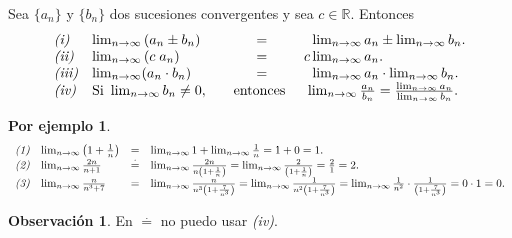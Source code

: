 \documentclass{article}
\theoremstyle{definition}
\newtheorem*{obs}{Observación}
\newtheorem*{ej}{Por ejemplo}
\theoremstyle{remark}
\begin{document}
\begin{teo}
  Sea $\{a_n\}$ y $\{b_n\}$ dos sucesiones convergentes y sea $c \in \mathbb{R}$. Entonces $$\begin{array}{llcl}

    \emph{(i)}      &   \lim_{n\to\infty}{\left(a_n \pm b_n\right)}\;&=&\phantom{c}\lim_{n \to \infty} a_n \pm \lim_{n \to \infty}{b_n}. \\
    \emph{(ii)}     &   \lim_{n \to \infty}{(c\; a_n)}\: \;\;\;\;\;\;&=& c \lim_{n \to \infty}{a_n}. \\
    \emph{(iii)}    &   \lim_{n\to\infty}(a_n\cdot b_n)&=&\phantom{c}\lim_{n\to\infty}a_n\cdot\lim_{n\to\infty}b_n. \\
    \emph{(iv)}     &  \text{Si } \lim_{n \to \infty}{b_n} \neq 0,\quad &\text{entonces   }& \; \lim_{n \to \infty} {\frac{a_n}{b_n}} = \frac{\lim_{n\to\infty}{a_n}}{\lim_{n\to\infty}{b_n}}.

  \end{array}$$
\end{teo}
\begin{ej}
  \[
  \begin{array}{llll}
    \emph{(1)} & \lim_{n\to\infty}{\left(1+\frac{1}{n}\right)} & = & \lim_{n \to \infty}{1} + \lim_{n \to \infty}{\frac{1}{n}}=1+0=1. \\
    \emph{(2)} & \lim_{n\to\infty}{\frac{2n}{n+1}} & \overset{\cdot}{=} & \lim_{n \to \infty}{\frac{2n}{n\left(1+\frac{1}{n}\right)}} = \lim_{n\to \infty}{\frac{2}{\left(1+\frac{1}{n}\right)}} = \frac{2}{1}=2. \\
  \emph{(3)} & \lim_{n\to\infty}{\frac{n}{n^3+7}} & = & \lim_{n \to \infty}{\frac{n}{n^3\left(1+\frac{7}{n^3}\right)}}=\lim_{n\to\infty}{\frac{1}{n^2\left(1+\frac{7}{n^3}\right)}}=\lim_{n \to \infty}{\frac{1}{n^2}\cdot \frac{1}{\left(1+\frac{7}{n^3}\right)}}= 0 \cdot 1 = 0.\\
  \end{array}
\]
\begin{obs}
  En $\overset{\cdot}{=}$ no puedo usar \emph{(iv)}.
\end{obs}
 \end{ej}
\end{document}

